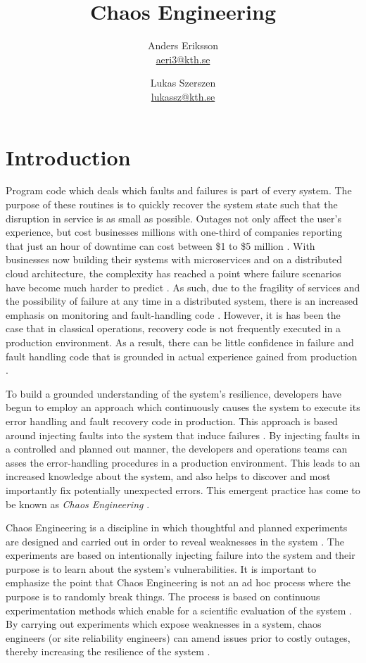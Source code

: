 \documentclass{article}
\title{\textbf{Chaos Engineering}}
\author{
    Anders Eriksson \\ \url{aeri3@kth.se}
    \and
    Lukas Szerszen \\ \url{lukassz@kth.se}
}
\begin{document}
\maketitle

\section{Introduction}
Program code which deals which faults and failures is part of every system. The purpose of these routines is to quickly recover the system state such that the disruption in service is as small as possible. Outages not only affect the user's experience, but cost businesses millions with one-third of companies reporting that just an hour of downtime can cost between \$1 to \$5 million \cite{GremlinPaper}. With businesses now building their systems with microservices and on a distributed cloud architecture, the complexity has reached a point where failure scenarios have become much harder to predict \cite{chaosEngineeringGremlin}. As such,
due to the fragility of services and the possibility of  failure at any time in a distributed system, there is an increased emphasis on monitoring and fault-handling code \cite{GremlinPaper}\cite{microserivces}. However, it is has been the case that in classical operations, recovery code is not frequently executed in a production environment. As a result, there can be little confidence in failure and fault handling code that is grounded in actual experience gained from production \cite{GremlinPaper}\cite{introductionToChaos}.

To build a grounded understanding of the system's resilience, developers have begun to employ an approach which continuously causes the system to execute its error handling and fault recovery code in production. This approach is based around injecting faults into the system that induce failures  \cite{GremlinPaper}. By injecting faults in a controlled and planned out manner, the developers and operations teams can asses the error-handling procedures in a production environment. This leads to an increased knowledge about the system, and also helps to discover and most importantly fix potentially unexpected errors. This emergent practice has come to be known as \textit{Chaos Engineering} \cite{GremlinPaper}.

Chaos Engineering is a discipline in which thoughtful and planned experiments are designed and carried out in order to reveal weaknesses in the system \cite{OreillyChaos}. The experiments are based on intentionally injecting failure into the system and their purpose is to learn about the system's vulnerabilities. It is important to emphasize the point that Chaos Engineering is not an ad hoc process where the purpose is to randomly break things. The process is based on continuous experimentation methods which enable for a scientific evaluation of the system \cite{OreillyChaos}. By carrying out experiments which expose weaknesses in a system, chaos engineers (or site reliability engineers) can amend issues prior to costly outages, thereby increasing the resilience  of the system \cite{OreillyChaos}.
\end{document}

